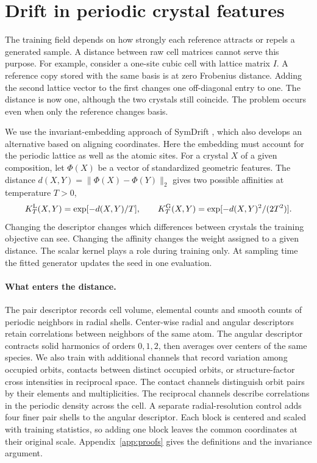 \section{Drift in periodic crystal features}\label{main:drift}

The training field depends on how strongly each reference attracts or repels a generated sample. A distance between raw cell matrices cannot serve this purpose. For example, consider a one-site cubic cell with lattice matrix \(I\). A reference copy stored with the same basis is at zero Frobenius distance. Adding the second lattice vector to the first changes one off-diagonal entry to one. The distance is now one, although the two crystals still coincide. The problem occurs even when only the reference changes basis.
 
We use the invariant-embedding approach of SymDrift \cite{symdrift}, which also develops an alternative based on aligning coordinates. Here the embedding must account for the periodic lattice as well as the atomic sites. For a crystal \(X\) of a given composition, let \(\Phi(X)\) be a vector of standardized geometric features. The distance \(d(X,Y)=\|\Phi(X)-\Phi(Y)\|_2\) gives two possible affinities at temperature \(T>0\),
\begin{equation}
 K_T^{\rm L}(X,Y)=\exp[-d(X,Y)/T],\qquad
 K_T^{\rm G}(X,Y)=\exp[-d(X,Y)^2/(2T^2)] .
 \label{eq:drift-affinities}
\end{equation}
Changing the descriptor changes which differences between crystals the training objective can see. Changing the affinity changes the weight assigned to a given distance. The scalar kernel plays a role during training only. At sampling time the fitted generator updates the seed in one evaluation.

\paragraph{What enters the distance.}
The pair descriptor records cell volume, elemental counts and smooth counts of periodic neighbors in radial shells. Center-wise radial and angular descriptors retain correlations between neighbors of the same atom. The angular descriptor contracts solid harmonics of orders \(0,1,2\), then averages over centers of the same species. We also train with additional channels that record variation among occupied orbits, contacts between distinct occupied orbits, or structure-factor cross intensities in reciprocal space. The contact channels distinguish orbit pairs by their elements and multiplicities. The reciprocal channels describe correlations in the periodic density across the cell. A separate radial-resolution control adds four finer pair shells to the angular descriptor. Each block is centered and scaled with training statistics, so adding one block leaves the common coordinates at their original scale. Appendix~\ref{app:proofs} gives the definitions and the invariance argument.

